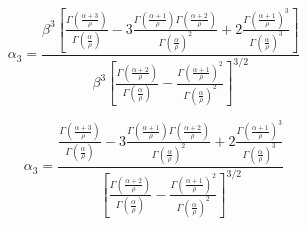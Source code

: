 \begin{frame}
    \begin{equation*}
        \alpha_3 = \frac{ \beta^3 \left[
                        \frac{ \Gamma \left (\frac{\alpha+3}{\rho}\right) }{ \Gamma \left (\frac{\alpha}{\rho} \right) }
                        - 3 \frac{ \Gamma \left (\frac{\alpha+1}{\rho} \right) \Gamma \left (\frac{\alpha+2}{\rho} \right) }{ \Gamma \left ( \frac{\alpha}{\rho} \right)^2 }
                        + 2 \frac{\Gamma \left (\frac{\alpha+1}{\rho} \right)^3}{\Gamma \left ( \frac{\alpha}{\rho} \right)^3}
                        \right]
                    }{
                        \beta^3 \left[ \frac{\Gamma \left (\frac{\alpha+2}{\rho} \right)}{{\Gamma \left ( \frac{\alpha}{\rho} \right)}} -
                        \frac{\Gamma \left (\frac{\alpha+1}{\rho} \right)^2}{{\Gamma \left ( \frac{\alpha}{\rho} \right)}^2} \right]^{3/2}
                    }
    \end{equation*}
\end{frame}

\begin{frame}
    \begin{equation*}
        \alpha_3 = \frac{
                        \frac{ \Gamma \left (\frac{\alpha+3}{\rho}\right) }{ \Gamma \left (\frac{\alpha}{\rho} \right) }
                        - 3 \frac{ \Gamma \left (\frac{\alpha+1}{\rho} \right) \Gamma \left (\frac{\alpha+2}{\rho} \right) }{ \Gamma \left ( \frac{\alpha}{\rho} \right)^2 }
                        + 2 \frac{\Gamma \left (\frac{\alpha+1}{\rho} \right)^3}{\Gamma \left ( \frac{\alpha}{\rho} \right)^3}
                    }{
                        \left[ \frac{\Gamma \left (\frac{\alpha+2}{\rho} \right)}{{\Gamma \left ( \frac{\alpha}{\rho} \right)}} -
                        \frac{\Gamma \left (\frac{\alpha+1}{\rho} \right)^2}{{\Gamma \left ( \frac{\alpha}{\rho} \right)}^2} \right]^{3/2}
                    }
    \end{equation*}
\end{frame}

